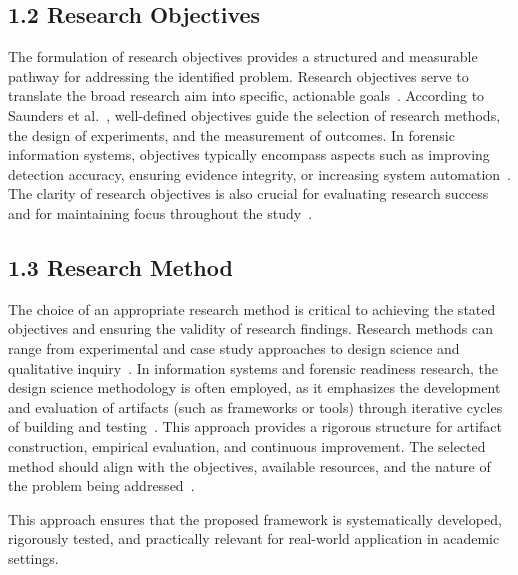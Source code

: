 \subsection{1.2 Research Objectives}

The formulation of research objectives provides a structured and measurable pathway for addressing the identified problem. Research objectives serve to translate the broad research aim into specific, actionable goals~\cite{creswell2014research}. According to Saunders et al.~\cite{saunders2019researchmethods}, well-defined objectives guide the selection of research methods, the design of experiments, and the measurement of outcomes. In forensic information systems, objectives typically encompass aspects such as improving detection accuracy, ensuring evidence integrity, or increasing system automation~\cite{adel2024ethicore}. The clarity of research objectives is also crucial for evaluating research success and for maintaining focus throughout the study~\cite{smith2011objectives}.

\subsection{1.3 Research Method}

The choice of an appropriate research method is critical to achieving the stated objectives and ensuring the validity of research findings. Research methods can range from experimental and case study approaches to design science and qualitative inquiry~\cite{hevner2004design}. In information systems and forensic readiness research, the design science methodology is often employed, as it emphasizes the development and evaluation of artifacts (such as frameworks or tools) through iterative cycles of building and testing~\cite{hevner2004design}. This approach provides a rigorous structure for artifact construction, empirical evaluation, and continuous improvement. The selected method should align with the objectives, available resources, and the nature of the problem being addressed~\cite{creswell2014research, saunders2019researchmethods}.

This approach ensures that the proposed framework is systematically developed, rigorously tested, and practically relevant for real-world application in academic settings.

